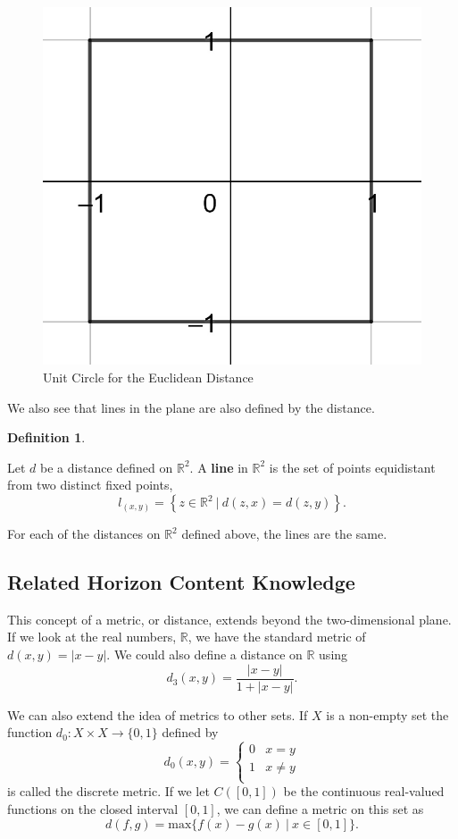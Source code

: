 \documentclass[
]{book}
\theoremstyle{definition}
\newtheorem{definition}{Definition}[chapter]
\theoremstyle{definition}
\theoremstyle{definition}
\theoremstyle{definition}
\theoremstyle{remark}
\begin{document}
\begin{figure}

{\centering \includegraphics[width=0.3\linewidth]{images/circle-Chebechev} 

}

\caption{Unit Circle for the Euclidean Distance}\label{fig:chebechev-circle}
\end{figure}

We also see that lines in the plane are also defined by the distance.

\begin{definition}
\protect\hypertarget{def:unlabeled-div-213}{}\label{def:unlabeled-div-213}

Let \(d\) be a distance defined on \(\mathbb{R}^2\). A \textbf{line} in \(\mathbb{R}^2\) is the set of points equidistant from two distinct fixed points,
\[l_{(x,y)} = \left\{ z\in \mathbb{R}^2 \: \vert \: d(z,x)=d(z,y)\right\}.\]

\end{definition}

For each of the distances on \(\mathbb{R}^2\) defined above, the lines are the same.

\hypertarget{related-horizon-content-knowledge-1}{%
\subsection{Related Horizon Content Knowledge}\label{related-horizon-content-knowledge-1}}

This concept of a metric, or distance, extends beyond the two-dimensional plane. If we look at the real numbers, \(\mathbb{R}\), we have the standard metric of \(d(x,y)=|x-y|\). We could also define a distance on \(\mathbb{R}\) using
\[d_3(x,y) = \frac{|x-y|}{1+|x-y|}.\]

We can also extend the idea of metrics to other sets. If \(X\) is a non-empty set the function \(d_0:X\times X \rightarrow \{0,1\}\) defined by \[d_0(x,y)=\begin{cases}
0 & x=y \\
1 & x\neq y \\
\end{cases}\] is called the discrete metric. If we let \(C([0,1])\) be the continuous real-valued functions on the closed interval \([0,1]\), we can define a metric on this set as \[d(f,g) = \mbox{max} \{ f(x)-g(x) \: \vert \: x\in [0,1]\}.\]
\end{document}
